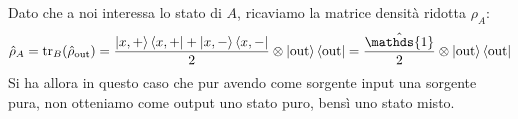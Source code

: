 Dato che a noi interessa lo stato di $A$, ricaviamo la matrice densità ridotta $\rho_A$:
\begin{equation*}
    \hat{\rho}_A = \operatorname{tr}_B (\hat{\rho}_{\text{out}}) = \frac{\ketbra{x, +}{x, +} + \ketbra{x, -}{x, -}}{2} \otimes \ketbra{\text{out}}{\text{out}} = \frac{\hat{\mathds{1}}}{2} \otimes \ketbra{\text{out}}{\text{out}}
\end{equation*}
Si ha allora in questo caso che pur avendo come sorgente input una sorgente pura, non otteniamo come output uno stato puro, bensì uno stato misto. 